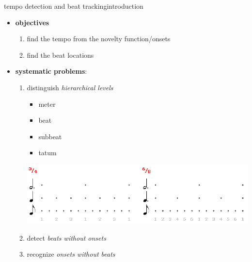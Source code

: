         \begin{frame}{tempo detection and beat tracking}{introduction}
            \begin{itemize}
                \item \textbf{objectives}
                    \begin{enumerate}
                        \item	find the tempo from the novelty function/onsets
                        \item	find the beat locations
                    \end{enumerate}
                \bigskip
                \item<2-> \textbf{systematic problems}:
                    \begin{enumerate}
                        \item	distinguish \textit{hierarchical levels}
                            \begin{itemize}
                                \item	meter
                                \item	beat
                                \item	subbeat
                                \item	tatum
                            \end{itemize}
                            \vspace{-17mm}
                            \begin{flushright}
                                \includegraphics[scale=.25]{graph/periodiclevels}
                            \end{flushright}
                        \item<3->	detect \textit{beats without onsets}
                        \item<3->	recognize \textit{onsets without beats}
                    \end{enumerate}
            \end{itemize}
            
        \end{frame}
